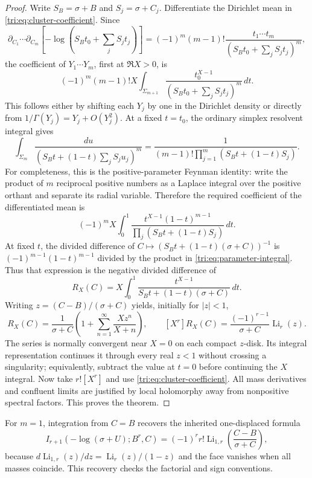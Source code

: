 \begin{proof}
Write $S_B=\sigma+B$ and $S_j=\sigma+C_j$. Differentiate the
Dirichlet mean in \eqref{tri:eq:cluster-coefficient}. Since
\[
 \partial_{C_1}\cdots\partial_{C_m}
   [-\log(S_Bt_0+\sum_jS_jt_j)]
  =(-1)^m(m-1)!\frac{t_1\cdots t_m}
                      {(S_Bt_0+\sum_jS_jt_j)^m},
\]
the coefficient of $Y_1\cdots Y_m$, first at $\Re X>0$, is
\[
 (-1)^m(m-1)!X\int_{\Sigma_{m+1}}
        \frac{t_0^{X-1}}{(S_Bt_0+\sum_jS_jt_j)^m}\,dt.
\]
This follows either by shifting each $Y_j$ by one in the Dirichlet
density or directly from $1/\Gamma(Y_j)=Y_j+O(Y_j^2)$.
At a fixed $t=t_0$, the ordinary simplex resolvent integral gives
\[
 \int_{\Sigma_m}\frac{du}
       {(S_Bt+(1-t)\sum_jS_ju_j)^m}
  =\frac{1}{(m-1)!\prod_{j=1}^m(S_Bt+(1-t)S_j)}.
\]
For completeness, this is the positive-parameter Feynman identity:
write the product of $m$ reciprocal positive numbers as a Laplace
integral over the positive orthant and separate its radial variable.
Therefore the required coefficient of the differentiated mean is
\begin{equation}\label{tri:eq:parameter-integral}
 (-1)^mX\int_0^1
  \frac{t^{X-1}(1-t)^{m-1}}
       {\prod_j(S_Bt+(1-t)S_j)}\,dt.
\end{equation}
At fixed $t$, the divided difference of
$C\mapsto(S_Bt+(1-t)(\sigma+C))^{-1}$ is
$(-1)^{m-1}(1-t)^{m-1}$ divided by the product in
\eqref{tri:eq:parameter-integral}. Thus that expression is the
negative divided difference of
\[
 R_X(C)=X\int_0^1
             \frac{t^{X-1}}{S_Bt+(1-t)(\sigma+C)}\,dt.
\]
Writing $z=(C-B)/(\sigma+C)$ yields, initially for $|z|<1$,
\begin{equation}\label{tri:eq:RX}
 R_X(C)=\frac1{\sigma+C}
       \left(1+\sum_{n=1}^{\infty}\frac{Xz^n}{X+n}\right),
 \qquad
 [X^r]R_X(C)=\frac{(-1)^{r-1}}{\sigma+C}\operatorname{Li}_r(z).
\end{equation}
The series is normally convergent near $X=0$ on each compact
$z$-disk. Its integral representation continues it through every
real $z<1$ without crossing a singularity; equivalently, subtract
the value at $t=0$ before continuing the $X$ integral. Now take
$r![X^r]$ and use \eqref{tri:eq:cluster-coefficient}. All mass
derivatives and confluent limits are justified by local holomorphy
away from nonpositive spectral factors. This proves the theorem.
\end{proof}

For $m=1$, integration from $C=B$ recovers the inherited
one-displaced formula
\begin{equation}\label{tri:eq:one-displaced}
 I_{r+1}(-\log(\sigma+U);B^r,C)
   =(-1)^r r!\operatorname{Li}_{1,r}
                         \!\left(\frac{C-B}{\sigma+C}\right),
\end{equation}
because $d\operatorname{Li}_{1,r}(z)/dz=
\operatorname{Li}_r(z)/(1-z)$ and the face vanishes when all masses
coincide. This recovery checks the factorial and sign conventions.

